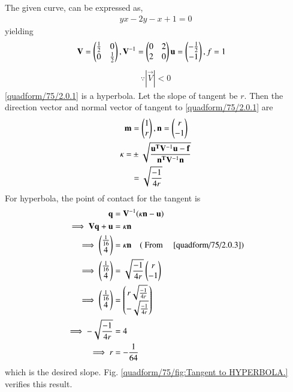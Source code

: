 The given curve,
 can be expressed as,
\begin{align}
yx-2y-x+1 =0
\label{quadform/75/2.0.1}
\end{align}
yielding
\begin{align}
\mathbf{V}&=\begin{pmatrix}\frac{1}{2} & 0 \\ 0 & \frac{1}{2}\end{pmatrix},\mathbf{V}^{-1}=\begin{pmatrix}0&2\\2&0\end{pmatrix}\mathbf{u}=\begin{pmatrix}-\frac{1}{2}\\-1\end{pmatrix},
f =1 \label{quadform/75/2.0.3}
\end{align}
\begin{align}
\because  |\vec{V}| < 0
\end{align}
 \eqref{quadform/75/2.0.1} is a hyperbola.
Let the slope of tangent be $r$. Then the  direction vector and normal vector of tangent to \eqref{quadform/75/2.0.1} are
\begin{align}
    \mathbf{m}&= \begin{pmatrix}1\\r\end{pmatrix},\mathbf{n}=\begin{pmatrix}r\\-1\end{pmatrix} \label{quadform/75/2.0.5}\\
\kappa=&\pm \sqrt{\frac{\mathbf{u^T}\mathbf{V}^{-1}\mathbf{u}-\mathbf{f}}{\mathbf{n^T}\mathbf{V}^{-1}\mathbf{n}}}\\
&=\sqrt{\frac{-1}{4r}} \label{quadform/75/2.0.8}
\end{align}
For hyperbola, the point of contact for the tangent is
\begin{align}
\mathbf{q}&=\mathbf{V}^{-1}(\kappa\mathbf{n}-\mathbf{u})\label{quadform/75/2.0.6}\\
\implies \mathbf{V}\mathbf{q}+\mathbf{u}&=\kappa\mathbf{n}\\
\implies \begin{pmatrix}\frac{1}{16}\\4\end{pmatrix}&=\kappa\mathbf{n} \quad ( \text{ From } \quad \eqref{quadform/75/2.0.3})\\
\implies \begin{pmatrix}\frac{1}{16}\\4\end{pmatrix}&=\sqrt{\frac{-1}{4r}}\begin{pmatrix}r\\-1\end{pmatrix}\\
\implies \begin{pmatrix}\frac{1}{16}\\4\end{pmatrix}&=\begin{pmatrix}r\sqrt{\frac{-1}{4r}}\\-\sqrt{\frac{-1}{4r}}\end{pmatrix}\\
\implies -\sqrt{\frac{-1}{4r}}&=4\\
\implies r &= -\frac{1}{64}
\end{align}
which is the desired slope. Fig.     \ref{quadform/75/fig:Tangent to HYPERBOLA.} verifies this result.
